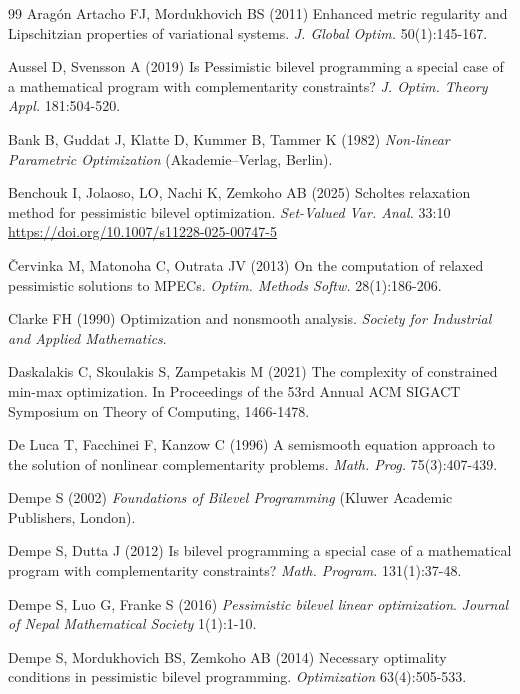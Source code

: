 
%
\begin{thebibliography}{99}
 Arag\'{o}n Artacho FJ,  Mordukhovich BS (2011) Enhanced metric regularity and Lipschitzian
 properties of variational systems. \emph{J. Global Optim.} 50(1):145-167.
	
 Aussel D, Svensson A   (2019) Is Pessimistic bilevel programming a
	special case of a mathematical program with complementarity constraints?
	\emph{J. Optim. Theory Appl.} 181:504-520.
	
 Bank B, Guddat J,  Klatte D, Kummer B, Tammer K (1982)
\emph{Non-linear Parametric Optimization} (Akademie--Verlag, Berlin).

Benchouk I, Jolaoso, LO, Nachi K, Zemkoho AB (2025) Scholtes relaxation method
for pessimistic bilevel optimization. \textit{Set-Valued Var. Anal.} 33:10  \href{https://doi.org/10.1007/s11228-025-00747-5}{https://doi.org/10.1007/s11228-025-00747-5}
	
 \v{C}ervinka  M, Matonoha C, Outrata JV (2013)  On the computation of
	relaxed pessimistic solutions to MPECs. \emph{Optim. Methods Softw.} 28(1):186-206.
 
  Clarke FH (1990) Optimization and nonsmooth analysis. \emph{{S}ociety for {I}ndustrial and {A}pplied {M}athematics}.
	
 Daskalakis C, Skoulakis S, Zampetakis M (2021) The complexity of constrained min-max optimization. In Proceedings of the 53rd Annual ACM SIGACT Symposium on Theory of Computing, 1466-1478.

 De Luca T, Facchinei F, Kanzow C (1996) A semismooth equation approach to the solution of nonlinear complementarity problems. \emph{Math. Prog.} 75(3):407-439.
	
 Dempe S (2002) \emph{Foundations of Bilevel Programming} (Kluwer Academic Publishers, London).
	
 Dempe S, Dutta J (2012)  Is bilevel programming a special case of a mathematical program with complementarity constraints? \emph{Math. Program.} 131(1):37-48.

 Dempe S, Luo G, Franke S (2016) \emph{Pessimistic bilevel linear optimization}. \textit{Journal of Nepal Mathematical Society} 1(1):1-10.
	
 Dempe S, Mordukhovich BS, Zemkoho AB (2014) Necessary optimality conditions in pessimistic bilevel programming. \emph{Optimization}  63(4):505-533.
	

\end{thebibliography}
